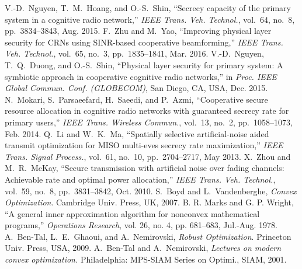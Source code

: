 \documentclass[journal,twoside]{IEEEtran}
\begin{document}
\begin{thebibliography}{999}
V.-D.~Nguyen, T.~M.~Hoang, and O.-S.~Shin, ``Secrecy capacity of the primary system in a cognitive radio network,'' {\em IEEE Trans. Veh. Technol.}, vol.~64, no.~8, pp.~3834--3843, Aug. 2015. 
F.~Zhu and M.~Yao, ``Improving physical layer security for CRNs using SINR-based cooperative beamforming,'' {\em IEEE Trans. Veh. Technol.}, vol.~65, no.~3, pp.~1835--1841, Mar. 2016.
V.-D.~Nguyen, T.~Q.~Duong, and O.-S.~Shin, ``Physical layer security for primary system: A symbiotic approach in cooperative cognitive radio networks,''  in {\em Proc. IEEE Global Commun. Conf. (GLOBECOM)}, San Diego, CA, USA, Dec. 2015. 
N.~Mokari, S.~Parsaeefard, H.~Saeedi, and P.~Azmi, ``Cooperative secure resource allocation in cognitive radio networks with guaranteed secrecy rate for primary users,'' {\em IEEE Trans. Wireless Commun.}, vol.~13, no.~2, pp.~1058--1073, Feb. 2014.
Q.~Li and W.~K.~Ma, ``Spatially selective artificial-noise aided transmit optimization for MISO multi-eves secrecy rate maximization,'' {\em IEEE Trans. Signal Process.}, vol.~61, no.~10, pp.~2704--2717, May 2013.
X.~Zhou and M.~R.~McKay, ``Secure transmission with artificial noise over fading channels: Achievable rate and optimal power allocation,'' {\em IEEE Trans. Veh. Technol.}, vol.~59, no.~8, pp.~3831--3842, Oct. 2010.
S.~Boyd and L.~Vandenberghe, {\em Convex Optimization}. Cambridge Univ. Press, UK, 2007. 
B. R. Marks and G. P. Wright, ``A general inner approximation algorithm for nonconvex mathematical programs,'' {\em Operations
Research}, vol. 26, no. 4, pp. 681--683, Jul.-Aug. 1978.
 A.~Ben-Tal, L.~E.~Ghaoui, and A.~Nemirovski, {\em Robust Optimization}.  Princeton Univ. Press, USA, 2009.
A.~Ben-Tal and A.~Nemirovski, {\em Lectures on modern convex optimization.} Philadelphia: MPS-SIAM Series on Optimi., SIAM, 2001.


\end{thebibliography}
\end{document}
